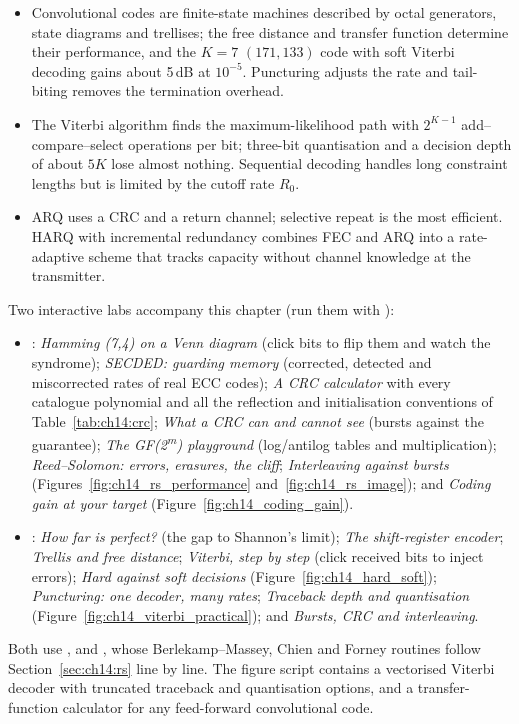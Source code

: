 \begin{itemize}
1993. Product and Reed--Muller codes build long codes from short ones.
\item Convolutional codes are finite-state machines described by octal generators, state diagrams and
trellises; the free distance and transfer function determine their performance, and the $K=7$ $(171,133)$
code with soft Viterbi decoding gains about 5\,dB at $10^{-5}$. Puncturing adjusts the rate and tail-biting
removes the termination overhead.
\item The Viterbi algorithm finds the maximum-likelihood path with $2^{K-1}$ add--compare--select operations
per bit; three-bit quantisation and a decision depth of about $5K$ lose almost nothing. Sequential
decoding handles long constraint lengths but is limited by the cutoff rate $R_0$.
\item ARQ uses a CRC and a return channel; selective repeat is the most efficient. HARQ with incremental
redundancy combines FEC and ARQ into a rate-adaptive scheme that tracks capacity without channel knowledge
at the transmitter.
\end{itemize}

\begin{labbox}
Two interactive labs accompany this chapter (run them with ):
\begin{itemize}
\item {}: \emph{Hamming (7,4) on a Venn diagram} (click
bits to flip them and watch the syndrome); \emph{SECDED: guarding memory} (corrected, detected and
miscorrected rates of real ECC codes); \emph{A CRC calculator} with every catalogue polynomial and all
the reflection and initialisation conventions of Table~\ref{tab:ch14:crc}; \emph{What a CRC can and
cannot see} (bursts against the guarantee); \emph{The GF(2\textsuperscript{m}) playground} (log/antilog
tables and multiplication); \emph{Reed--Solomon: errors, erasures, the cliff}; \emph{Interleaving
against bursts} (Figures~\ref{fig:ch14_rs_performance} and~\ref{fig:ch14_rs_image}); and \emph{Coding
gain at your target} (Figure~\ref{fig:ch14_coding_gain}).
\item {}: \emph{How far is perfect?} (the gap to
Shannon's limit); \emph{The shift-register encoder}; \emph{Trellis and free distance}; \emph{Viterbi,
step by step} (click received bits to inject errors); \emph{Hard against soft decisions}
(Figure~\ref{fig:ch14_hard_soft}); \emph{Puncturing: one decoder, many rates}; \emph{Traceback depth
and quantisation} (Figure~\ref{fig:ch14_viterbi_practical}); and \emph{Bursts, CRC and interleaving}.
\end{itemize}
Both use ,  and , whose
Berlekamp--Massey, Chien and Forney routines follow Section~\ref{sec:ch14:rs} line by line. The figure
script  contains a vectorised Viterbi decoder with truncated traceback
and quantisation options, and a transfer-function calculator for any feed-forward convolutional code.
\end{labbox}

